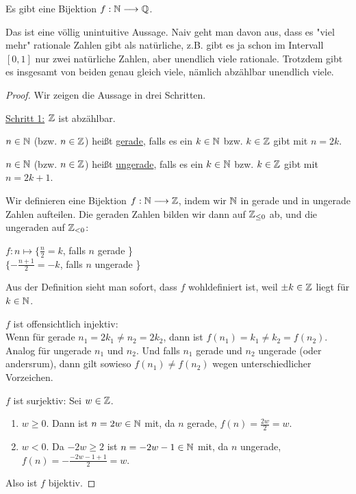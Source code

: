 \begin{theorem}
    \label{theorem-cantor-1}
    Es gibt eine Bijektion $f: \mathbb{N} \longrightarrow \mathbb{Q}$.
\end{theorem}
Das ist eine völlig unintuitive Aussage. Naiv geht man davon aus, dass es "viel mehr" rationale Zahlen gibt als natürliche, z.B. gibt es ja schon im Intervall $[0, 1]$ nur zwei natürliche Zahlen, aber unendlich viele rationale. Trotzdem gibt es insgesamt von beiden genau gleich viele, nämlich abzählbar unendlich viele.
\begin{proof}
    Wir zeigen die Aussage in drei Schritten.

    \underline{Schritt 1:} $\mathbb{Z}$ ist abzählbar.
    
    $n \in \mathbb{N}$ (bzw. $n \in \mathbb{Z}$) heißt \underline{gerade}, falls es ein $k \in \mathbb{N}$ bzw. $k \in \mathbb{Z}$ gibt mit $n = 2k$.

    $n \in \mathbb{N}$ (bzw. $n \in \mathbb{Z}$) heißt \underline{ungerade}, falls es ein $k \in \mathbb{N}$ bzw. $k \in \mathbb{Z}$ gibt mit $n = 2k + 1$.

    Wir definieren eine Bijektion $f: \mathbb{N} \longrightarrow \mathbb{Z}$, indem wir $\mathbb{N}$ in gerade und in ungerade Zahlen aufteilen. Die geraden Zahlen bilden wir dann auf $\mathbb{Z}_{\leq 0}$ ab, und die ungeraden auf $\mathbb{Z}_{< 0}$:

    $f: n \mapsto \{ \frac{n}{2} = k$, falls $n$ gerade \}\\
    $\{ - \frac{n + 1}{2} = -k$, falls $n$ ungerade \}

    Aus der Definition sieht man sofort, dass $f$ wohldefiniert ist, weil $\pm k \in \mathbb{Z}$ liegt für $k \in \mathbb{N}$.

    $f$ ist offensichtlich injektiv:\\
    Wenn für gerade $n_1 = 2 k_1 \neq n_2 = 2 k_2$, dann ist $f(n_1) = k_1 \neq k_2 = f(n_2)$. Analog für ungerade $n_1$ und $n_2$. Und falls $n_1$ gerade und $n_2$ ungerade (oder andersrum), dann gilt sowieso $f(n_1) \neq f(n_2)$ wegen unterschiedlicher Vorzeichen.

    $f$ ist surjektiv: Sei $w \in \mathbb{Z}$.
    \begin{enumerate}[label=Fall \arabic*:]
        \item $w \geq 0$. Dann ist $n = 2w \in \mathbb{N}$ mit, da $n$ gerade, $f(n) = \frac{2 w}{2} = w$.
        \item $w < 0$. Da $-2w \geq 2$ ist $n = -2w - 1 \in \mathbb{N}$  mit, da $n$ ungerade, $f(n) = - \frac{-2w - 1 + 1}{2} = w$.
    \end{enumerate}

    Also ist $f$ bijektiv.


\end{proof}
